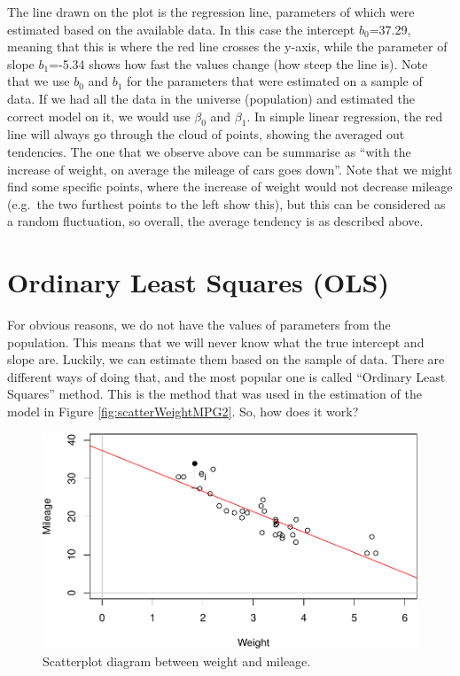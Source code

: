 \documentclass[
]{book}
\theoremstyle{definition}
\theoremstyle{definition}
\theoremstyle{definition}
\theoremstyle{definition}
\theoremstyle{remark}
\begin{document}
The line drawn on the plot is the regression line, parameters of which were estimated based on the available data. In this case the intercept \({b}_0\)=37.29, meaning that this is where the red line crosses the y-axis, while the parameter of slope \({b}_1\)=-5.34 shows how fast the values change (how steep the line is). Note that we use \(b_0\) and \(b_1\) for the parameters that were estimated on a sample of data. If we had all the data in the universe (population) and estimated the correct model on it, we would use \(\beta_0\) and \(\beta_1\). In simple linear regression, the red line will always go through the cloud of points, showing the averaged out tendencies. The one that we observe above can be summarise as ``with the increase of weight, on average the mileage of cars goes down''. Note that we might find some specific points, where the increase of weight would not decrease mileage (e.g.~the two furthest points to the left show this), but this can be considered as a random fluctuation, so overall, the average tendency is as described above.

\hypertarget{OLS}{%
\section{Ordinary Least Squares (OLS)}\label{OLS}}

For obvious reasons, we do not have the values of parameters from the population. This means that we will never know what the true intercept and slope are. Luckily, we can estimate them based on the sample of data. There are different ways of doing that, and the most popular one is called ``Ordinary Least Squares'' method. This is the method that was used in the estimation of the model in Figure \ref{fig:scatterWeightMPG2}. So, how does it work?

\begin{figure}
\centering
\includegraphics{Svetunkov---Statistics-for-Business-Analytics_files/figure-latex/scatterWeightMPG3-1.pdf}
\caption{\label{fig:scatterWeightMPG3}Scatterplot diagram between weight and mileage.}
\end{figure}
\end{document}
